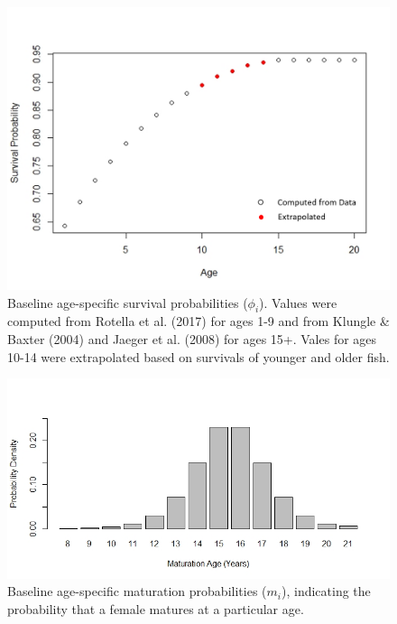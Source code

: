 \documentclass[12pt]{article}
\begin{document}
\begin{figure}[h]
\centering
\includegraphics[width=6in]{NEPA_fig_3-survivals-w-key}
\caption{Baseline age-specific survival probabilities ($\phi_i$).  Values were computed from Rotella et al. (2017) for ages 1-9 and from Klungle \& Baxter (2004) and Jaeger et al. (2008) for ages 15+.  Vales for ages 10-14 were extrapolated based on survivals of younger and older fish.}
\end{figure}


\begin{figure}[h]
\centering
\includegraphics[width=6in]{NEPA_fig_4-maturation}
\caption{Baseline age-specific maturation probabilities ($m_i$), indicating the probability that a female matures at a particular age.}
\end{figure}
\end{document}

